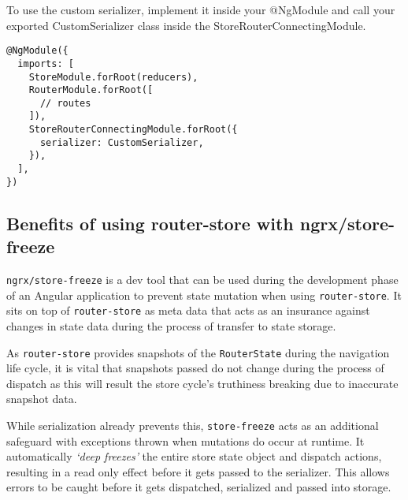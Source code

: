 To use the custom serializer, implement it inside your @NgModule and call your
exported CustomSerializer class inside the StoreRouterConnectingModule.

\begin{lstlisting}
@NgModule({
  imports: [
    StoreModule.forRoot(reducers),
    RouterModule.forRoot([
      // routes
    ]),
    StoreRouterConnectingModule.forRoot({
      serializer: CustomSerializer,
    }),
  ],
})
\end{lstlisting}

\subsection{Benefits of using router-store with ngrx/store-freeze}
\texttt{ngrx/store-freeze} is a dev tool that can be used during the development
phase of an Angular application to prevent state mutation when using
\texttt{router-store}. It sits on top of \texttt{router-store} as meta data that
acts as an insurance against changes in state data during the process of
transfer to state storage.

As \texttt{router-store} provides snapshots of the \texttt{RouterState} during
the navigation life cycle, it is vital that snapshots passed do not change
during the process of dispatch as this will result the store cycle’s truthiness
breaking due to inaccurate snapshot data.

While serialization already prevents this, \texttt{store-freeze} acts as an
additional safeguard with exceptions thrown when mutations do occur at runtime.
It automatically \emph{`deep freezes'} the entire store state object and
dispatch actions, resulting in a read only effect before it gets passed to the
serializer. This allows errors to be caught before it gets dispatched,
serialized and passed into storage.
